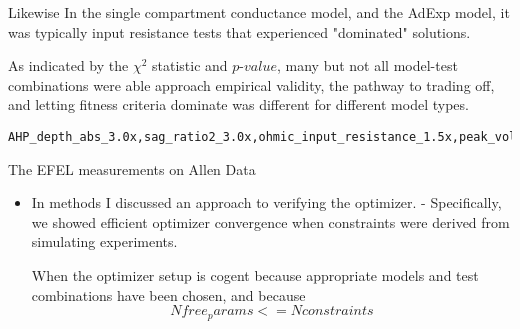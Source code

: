 Likewise In the single compartment conductance model, and the AdExp model, it was typically input resistance tests that experienced "dominated" solutions. 

As indicated by the $\chi^{2}$ statistic and $p$-$value$, many but not all model-test combinations were able approach empirical validity, the pathway to trading off, and letting fitness criteria dominate was different for different model types.




\begin{verbatim}
AHP_depth_abs_3.0x,sag_ratio2_3.0x,ohmic_input_resistance_1.5x,peak_voltage_3.0x,voltage_base_3.0x,Spikecount_3.0x,ohmic_input_resistance_vb_ssse_1.5x. 
\end{verbatim}

The EFEL measurements on Allen Data








\begin{itemize}

\item  In methods I discussed an approach to verifying the optimizer.
- Specifically, we showed efficient optimizer convergence when constraints were derived from simulating experiments.

When the optimizer setup is cogent because appropriate models and test combinations have been chosen, and because 
\begin{equation}

N free_params <= N constraints
\end{equation}


\end{itemize}

